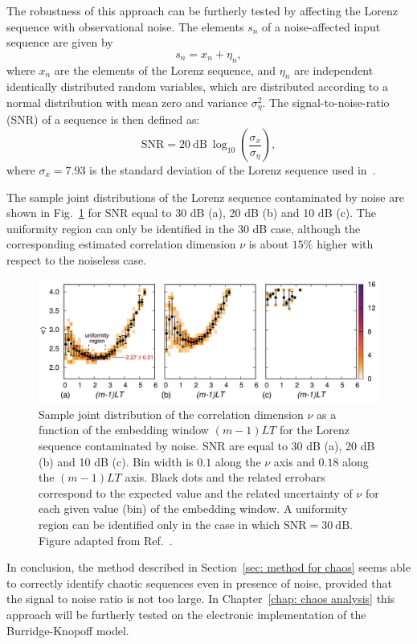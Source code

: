 The robustness of this approach can be furtherly tested by affecting the Lorenz sequence with
observational noise. The elements $s_n$ of a noise-affected input sequence are given by
\begin{equation}
    \label{eq: noise sequence}
    s_n=x_n+\eta_n,
\end{equation}
where $x_n$ are the elements of the Lorenz sequence, and $\eta_n$ are independent
identically distributed random variables, which are distributed according to a normal distribution
with mean zero and variance $\sigma_\eta^2$.
The signal-to-noise-ratio (SNR) of a sequence is then defined as:
\begin{equation}
    \label{eq: snr}
    \text{SNR}= 20~\text{dB}~\log_{10}\left(\frac{\sigma_x}{\sigma_\eta}\right),
\end{equation}
where $\sigma_x=7.93$ is the standard deviation of the Lorenz sequence used in~\cite{ref:perinelli2020chasing}.

The sample joint distributions of the Lorenz sequence contaminated by noise are shown in Fig.~\ref{fig: Lorenz noise joint}
for SNR equal to 30 dB (a), 20 dB (b) and 10 dB (c).
The uniformity region can only be identified in the 30 dB case, although the corresponding estimated
correlation dimension $\nu$ is about $15\%$ higher with respect to the noiseless case.

\begin{figure}[!htbp]
    \centering
    \includegraphics[width=\linewidth]{images/joint_Lorenz_noise.png}
    \caption{Sample joint distribution of the correlation dimension $\nu$ as a function of the
    embedding window $(m-1)LT$ for the Lorenz sequence contaminated by noise.
    SNR are equal to 30 dB (a), 20 dB (b) and 10 dB (c).
    Bin width is $0.1$ along the $\nu$ axis and
    $0.18$ along the $(m-1)LT$ axis.
    Black dots and the related errobars correspond to the expected value and the related uncertainty of
    $\nu$ for each given value (bin) of the embedding window. A uniformity region can be identified
    only in the case in which $\text{SNR}=30~\text{dB}$.
    Figure adapted from Ref.~\cite{ref:perinelli2020chasing}.
    }\label{fig: Lorenz noise joint}
\end{figure}

In conclusion, the method described in Section~\ref{sec: method for chaos} seems able to correctly identify
chaotic sequences even in presence of noise, provided that the signal to noise ratio is not too large.
In Chapter~\ref{chap: chaos analysis} this approach will be furtherly tested on the electronic implementation
of the Burridge-Knopoff model.

